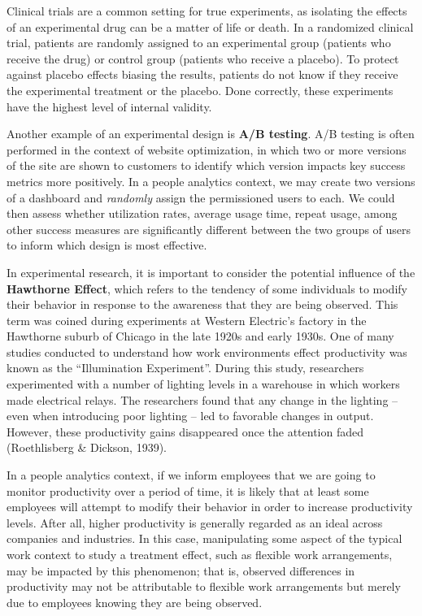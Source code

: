 \documentclass[
]{book}
\begin{document}
Clinical trials are a common setting for true experiments, as isolating the effects of an experimental drug can be a matter of life or death. In a randomized clinical trial, patients are randomly assigned to an experimental group (patients who receive the drug) or control group (patients who receive a placebo). To protect against placebo effects biasing the results, patients do not know if they receive the experimental treatment or the placebo. Done correctly, these experiments have the highest level of internal validity.

Another example of an experimental design is \textbf{A/B testing}. A/B testing is often performed in the context of website optimization, in which two or more versions of the site are shown to customers to identify which version impacts key success metrics more positively. In a people analytics context, we may create two versions of a dashboard and \emph{randomly} assign the permissioned users to each. We could then assess whether utilization rates, average usage time, repeat usage, among other success measures are significantly different between the two groups of users to inform which design is most effective.

In experimental research, it is important to consider the potential influence of the \textbf{Hawthorne Effect}, which refers to the tendency of some individuals to modify their behavior in response to the awareness that they are being observed. This term was coined during experiments at Western Electric's factory in the Hawthorne suburb of Chicago in the late 1920s and early 1930s. One of many studies conducted to understand how work environments effect productivity was known as the ``Illumination Experiment''. During this study, researchers experimented with a number of lighting levels in a warehouse in which workers made electrical relays. The researchers found that any change in the lighting -- even when introducing poor lighting -- led to favorable changes in output. However, these productivity gains disappeared once the attention faded (Roethlisberg \& Dickson, 1939).

In a people analytics context, if we inform employees that we are going to monitor productivity over a period of time, it is likely that at least some employees will attempt to modify their behavior in order to increase productivity levels. After all, higher productivity is generally regarded as an ideal across companies and industries. In this case, manipulating some aspect of the typical work context to study a treatment effect, such as flexible work arrangements, may be impacted by this phenomenon; that is, observed differences in productivity may not be attributable to flexible work arrangements but merely due to employees knowing they are being observed.
\end{document}
